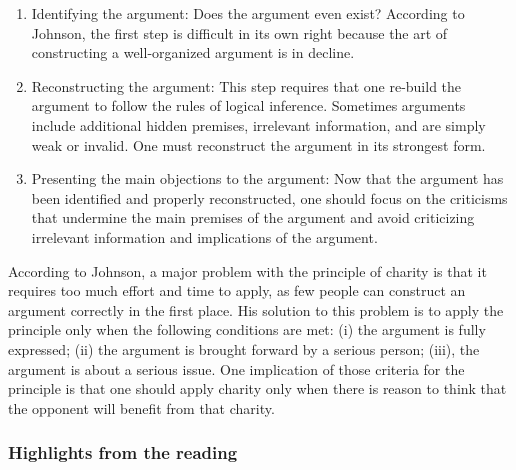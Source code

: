 \documentclass[
]{book}
\providecommand{\tightlist}{%
  \setlength{\itemsep}{0pt}\setlength{\parskip}{0pt}}
\begin{document}
\begin{enumerate}
\def\labelenumi{\arabic{enumi}.}
\tightlist
\item
  Identifying the argument: Does the argument even exist? According to Johnson, the first step is difficult in its own right because the art of constructing a well-organized argument is in decline.\\
\item
  Reconstructing the argument: This step requires that one re-build the argument to follow the rules of logical inference. Sometimes arguments include additional hidden premises, irrelevant information, and are simply weak or invalid. One must reconstruct the argument in its strongest form.\\
\item
  Presenting the main objections to the argument: Now that the argument has been identified and properly reconstructed, one should focus on the criticisms that undermine the main premises of the argument and avoid criticizing irrelevant information and implications of the argument.
\end{enumerate}

According to Johnson, a major problem with the principle of charity is that it requires too much effort and time to apply, as few people can construct an argument correctly in the first place. His solution to this problem is to apply the principle only when the following conditions are met: (i) the argument is fully expressed; (ii) the argument is brought forward by a serious person; (iii), the argument is about a serious issue. One implication of those criteria for the principle is that one should apply charity only when there is reason to think that the opponent will benefit from that charity.

\hypertarget{highlights-from-the-reading-4}{%
\subsubsection*{Highlights from the reading}\label{highlights-from-the-reading-4}}
\end{document}
